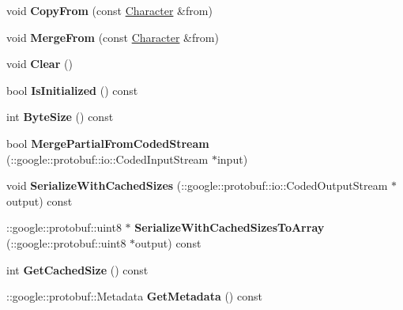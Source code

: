 \begin{DoxyCompactItemize}
\item 
void {\bfseries Copy\+From} (const \hyperlink{classCharacter}{Character} \&from)\hypertarget{classCharacter_add0afd0f841d005acea8326ca2028d90}{}\label{classCharacter_add0afd0f841d005acea8326ca2028d90}

\item 
void {\bfseries Merge\+From} (const \hyperlink{classCharacter}{Character} \&from)\hypertarget{classCharacter_adcf70ea964c51f2608063282baeaa607}{}\label{classCharacter_adcf70ea964c51f2608063282baeaa607}

\item 
void {\bfseries Clear} ()\hypertarget{classCharacter_a42a81f720f0dc1c2e5f0ac1c03ce3251}{}\label{classCharacter_a42a81f720f0dc1c2e5f0ac1c03ce3251}

\item 
bool {\bfseries Is\+Initialized} () const \hypertarget{classCharacter_a99242fb29ccace1bd0e21f3a79c954fb}{}\label{classCharacter_a99242fb29ccace1bd0e21f3a79c954fb}

\item 
int {\bfseries Byte\+Size} () const \hypertarget{classCharacter_af8c367cdffe969e07ad8917b5a107545}{}\label{classCharacter_af8c367cdffe969e07ad8917b5a107545}

\item 
bool {\bfseries Merge\+Partial\+From\+Coded\+Stream} (\+::google\+::protobuf\+::io\+::\+Coded\+Input\+Stream $\ast$input)\hypertarget{classCharacter_a9a96e8b83784508722e34b21172c7c57}{}\label{classCharacter_a9a96e8b83784508722e34b21172c7c57}

\item 
void {\bfseries Serialize\+With\+Cached\+Sizes} (\+::google\+::protobuf\+::io\+::\+Coded\+Output\+Stream $\ast$output) const \hypertarget{classCharacter_a922061bd15e72f5289a3d08f0fee7002}{}\label{classCharacter_a922061bd15e72f5289a3d08f0fee7002}

\item 
\+::google\+::protobuf\+::uint8 $\ast$ {\bfseries Serialize\+With\+Cached\+Sizes\+To\+Array} (\+::google\+::protobuf\+::uint8 $\ast$output) const \hypertarget{classCharacter_a0d5473252d5df1e2093474324c05f1e3}{}\label{classCharacter_a0d5473252d5df1e2093474324c05f1e3}

\item 
int {\bfseries Get\+Cached\+Size} () const \hypertarget{classCharacter_aed109b1efca920ee333712746bcfd256}{}\label{classCharacter_aed109b1efca920ee333712746bcfd256}

\item 
\+::google\+::protobuf\+::\+Metadata {\bfseries Get\+Metadata} () const \hypertarget{classCharacter_a131cbcdb689033b8696fce65d0b890c0}{}\label{classCharacter_a131cbcdb689033b8696fce65d0b890c0}


\end{DoxyCompactItemize}
